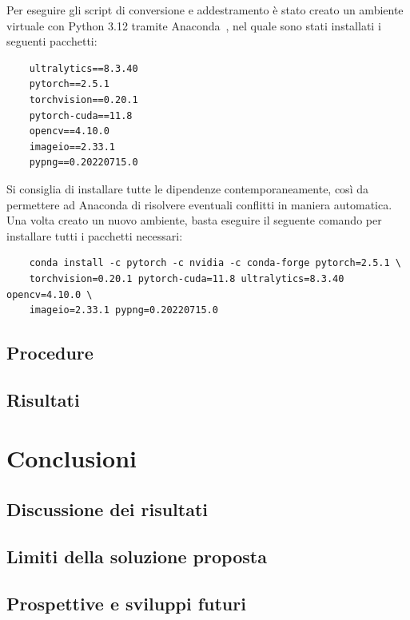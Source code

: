 \documentclass[12pt]{report}
\begin{document}
Per eseguire gli script di conversione e addestramento è stato creato un ambiente virtuale con Python 3.12 tramite Anaconda~\cite{anaconda}, nel quale sono stati installati i seguenti pacchetti:

\begin{verbatim}
	ultralytics==8.3.40
	pytorch==2.5.1
	torchvision==0.20.1
	pytorch-cuda==11.8
	opencv==4.10.0
	imageio==2.33.1
	pypng==0.20220715.0
\end{verbatim}

Si consiglia di installare tutte le dipendenze contemporaneamente, così da permettere ad Anaconda di risolvere eventuali conflitti in maniera automatica. Una volta creato un nuovo ambiente, basta eseguire il seguente comando per installare tutti i pacchetti necessari:

\begin{verbatim}
	conda install -c pytorch -c nvidia -c conda-forge pytorch=2.5.1 \
	torchvision=0.20.1 pytorch-cuda=11.8 ultralytics=8.3.40 opencv=4.10.0 \
	imageio=2.33.1 pypng=0.20220715.0
\end{verbatim}

\section{Procedure}
\label{procedure}

\section{Risultati}
\label{risultati}

\chapter{Conclusioni}
\label{chap:conclusioni}

\section{Discussione dei risultati}
\label{chap:discussione_risultati}

\section{Limiti della soluzione proposta}
\label{chap:limiti}

\section{Prospettive e sviluppi futuri}
\label{chap:prospettive}

\beforebibliography



\closingpage
\end{document}
